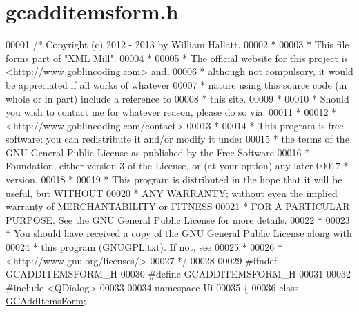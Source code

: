 \hypertarget{gcadditemsform_8h_source}{\section{gcadditemsform.\-h}
}

\begin{DoxyCode}
00001 \textcolor{comment}{/* Copyright (c) 2012 - 2013 by William Hallatt.}
00002 \textcolor{comment}{ *}
00003 \textcolor{comment}{ * This file forms part of "XML Mill".}
00004 \textcolor{comment}{ *}
00005 \textcolor{comment}{ * The official website for this project is <http://www.goblincoding.com> and,}
00006 \textcolor{comment}{ * although not compulsory, it would be appreciated if all works of whatever}
00007 \textcolor{comment}{ * nature using this source code (in whole or in part) include a reference to}
00008 \textcolor{comment}{ * this site.}
00009 \textcolor{comment}{ *}
00010 \textcolor{comment}{ * Should you wish to contact me for whatever reason, please do so via:}
00011 \textcolor{comment}{ *}
00012 \textcolor{comment}{ *                 <http://www.goblincoding.com/contact>}
00013 \textcolor{comment}{ *}
00014 \textcolor{comment}{ * This program is free software: you can redistribute it and/or modify it
       under}
00015 \textcolor{comment}{ * the terms of the GNU General Public License as published by the Free
       Software}
00016 \textcolor{comment}{ * Foundation, either version 3 of the License, or (at your option) any later}
00017 \textcolor{comment}{ * version.}
00018 \textcolor{comment}{ *}
00019 \textcolor{comment}{ * This program is distributed in the hope that it will be useful, but WITHOUT}
00020 \textcolor{comment}{ * ANY WARRANTY; without even the implied warranty of MERCHANTABILITY or
       FITNESS}
00021 \textcolor{comment}{ * FOR A PARTICULAR PURPOSE.  See the GNU General Public License for more
       details.}
00022 \textcolor{comment}{ *}
00023 \textcolor{comment}{ * You should have received a copy of the GNU General Public License along with}
00024 \textcolor{comment}{ * this program (GNUGPL.txt).  If not, see}
00025 \textcolor{comment}{ *}
00026 \textcolor{comment}{ *                    <http://www.gnu.org/licenses/>}
00027 \textcolor{comment}{ */}
00028 
00029 \textcolor{preprocessor}{#ifndef GCADDITEMSFORM\_H}
00030 \textcolor{preprocessor}{}\textcolor{preprocessor}{#define GCADDITEMSFORM\_H}
00031 \textcolor{preprocessor}{}
00032 \textcolor{preprocessor}{#include <QDialog>}
00033 
00034 \textcolor{keyword}{namespace }Ui
00035 \{
00036   \textcolor{keyword}{class }\hyperlink{class_g_c_add_items_form}{GCAddItemsForm};

\end{DoxyCode}
